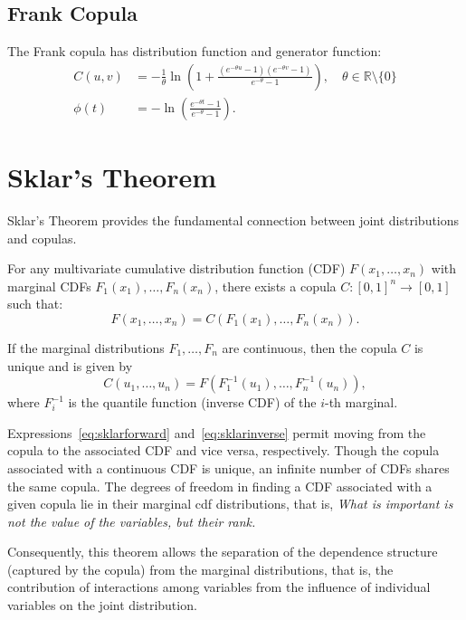 \documentclass[
	11pt, %
	fleqn, %
	a4paper, %
]{LegrandOrangeBook}
\begin{document}
\subsection{Frank Copula}
The Frank copula has distribution function and generator function:
\begin{align}
C(u, v) &= -\frac{1}{\theta} \ln\left(1 + \frac{(e^{-\theta u} - 1)(e^{-\theta v} - 1)}{e^{-\theta} - 1}\right), \quad \theta \in \mathbb{R} \setminus \{0\} \\
\phi(t) &= -\ln\left(\frac{e^{-\theta t} - 1}{e^{-\theta} - 1}\right).
\end{align}

\section{Sklar's Theorem}
Sklar's Theorem provides the fundamental connection between joint distributions and copulas.

\begin{theorem}
\label{thm:sklar}
For any multivariate cumulative distribution function (CDF) $F(x_1,\ldots, x_n)$ with marginal CDFs $F_1(x_1),\ldots,F_n(x_n)$, there exists a copula $C : [0,1]^n \to [0,1]$ such that:
\begin{equation}
F(x_1,\ldots, x_n) = C(F_1(x_1),\ldots,F_n(x_n)).
\label{eq:sklarforward}
\end{equation}

If the marginal distributions $F_1,\ldots,F_n$ are continuous, then the copula $C$ is unique and is given by
\begin{equation}
C(u_1,\ldots,u_n) = F(F_1^{-1}(u_1),\ldots,F_n^{-1}(u_n)),
\label{eq:sklarinverse}
\end{equation}
where $F_i^{-1}$ is the quantile function (inverse CDF) of the $i$-th marginal.
\end{theorem}

Expressions~\eqref{eq:sklarforward} and~\eqref{eq:sklarinverse} permit moving from the copula to the associated CDF and vice versa, respectively. Though the copula associated with a continuous CDF is unique, an infinite number of CDFs shares the same copula. The degrees of freedom in finding a CDF associated with a given copula lie in their marginal cdf distributions, that is, \textit{What is important is not the value of the variables, but their rank.}

Consequently, this theorem allows the separation of the dependence structure (captured by the copula) from the marginal distributions, that is, the contribution of interactions among variables from the influence of individual variables on the joint distribution.
\end{document}
